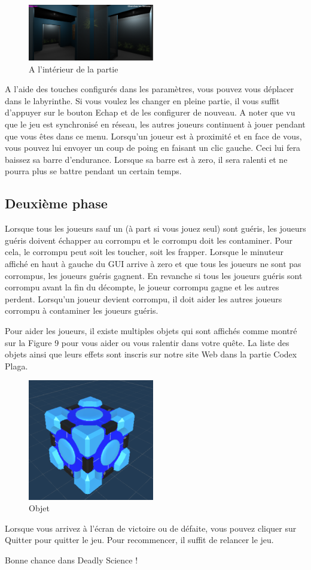 \documentclass{article}
\begin{document}
\begin{figure}[H]
	\centering
	\includegraphics[width=0.49\textwidth]{Lumieres.png}
	\caption{A l'intérieur de la partie}
	\label{A l'intérieur de la partie}
\end{figure}

A l'aide des touches configurés dans les paramètres, vous pouvez vous déplacer dans le labyrinthe. Si vous voulez les changer en pleine partie, il vous suffit d'appuyer sur le bouton Echap et de les configurer de nouveau. A noter que vu que le jeu est synchronisé en réseau, les autres joueurs continuent à jouer pendant que vous êtes dans ce menu. Lorsqu'un joueur est à proximité et en face de vous, vous pouvez lui envoyer un coup de poing en faisant un clic gauche. Ceci lui fera baissez sa barre d'endurance. Lorsque sa barre est à zero, il sera ralenti et ne pourra plus se battre pendant un certain temps.

\subsection{Deuxième phase}

Lorsque tous les joueurs sauf un (à part si vous jouez seul) sont guéris, les joueurs guéris doivent échapper au corrompu et le corrompu doit les contaminer. Pour cela, le corrompu peut soit les toucher, soit les frapper. Lorsque le minuteur affiché en haut à gauche du GUI arrive à zero et que tous les joueurs ne sont pas corrompus, les joueurs guéris gagnent. En revanche si tous les joueurs guéris sont corrompu avant la fin du décompte, le joueur corrompu gagne et les autres perdent. Lorsqu'un joueur devient corrompu, il doit aider les autres joueurs corrompu à contaminer les joueurs guéris.

Pour aider les joueurs, il existe multiples objets qui sont affichés comme montré sur la Figure 9 pour vous aider ou vous ralentir dans votre quête. La liste des objets ainsi que leurs effets sont inscris sur notre site Web dans la partie Codex Plaga. 

\begin{figure}[H]
	\centering
	\includegraphics[width=0.49\textwidth]{Objet.png}
	\caption{Objet}
	\label{Objet}
\end{figure}

Lorsque vous arrivez à l'écran de victoire ou de défaite, vous pouvez cliquer sur Quitter pour quitter le jeu. Pour recommencer, il suffit de relancer le jeu.

Bonne chance dans Deadly Science !
\end{document}
